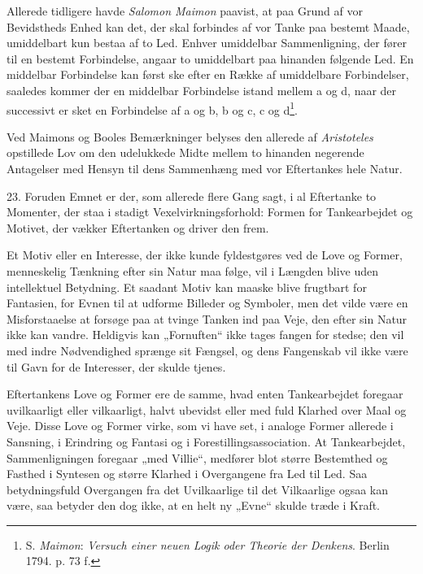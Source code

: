 \documentclass[12pt,a4paper]{book}
\newcommand{\apage}[1]{\marginnote{\footnotesize\textit{[#1]}}}
\begin{document}
Allerede tidligere havde \emph{Salomon Maimon} paavist, at paa Grund af
vor Bevidstheds Enhed kan det, der skal forbindes af vor Tanke paa
bestemt Maade, umiddelbart kun bestaa af to Led. Enhver umiddelbar
Sammenligning, der fører til en bestemt Forbindelse, angaar to
umiddelbart paa hinanden følgende Led. En middelbar Forbindelse kan
først ske efter en Række af umiddelbare Forbindelser, saaledes \apage{69} kommer
der en middelbar Forbindelse istand mellem a og d, naar der successivt
er sket en Forbindelse af a og b, b og c, c og d\footnote{S.
\emph{Maimon}: \emph{Versuch einer neuen Logik oder Theorie der Denkens}. Berlin 1794. p. 73 f.}.

Ved Maimons og Booles Bemærkninger belyses den allerede af
\emph{Aristoteles} opstillede Lov om den udelukkede Midte mellem to
hinanden negerende Antagelser med Hensyn til dens Sammenhæng med vor
Eftertankes hele Natur.

23. Foruden Emnet er der, som allerede flere Gang sagt, i al Eftertanke
to Momenter, der staa i stadigt Vexelvirkningsforhold: Formen for
Tankearbejdet og Motivet, der vækker Eftertanken og driver den frem.

Et Motiv eller en Interesse, der ikke kunde fyldestgøres ved de Love og
Former, menneskelig Tænkning efter sin Natur maa følge, vil i Længden
blive uden intellektuel Betydning. Et saadant Motiv kan maaske blive
frugtbart for Fantasien, for Evnen til at udforme Billeder og Symboler,
men det vilde være en Misforstaaelse at forsøge paa at tvinge Tanken ind
paa Veje, den efter sin Natur ikke kan vandre. Heldigvis kan
„Fornuften“ ikke tages fangen for stedse; den vil med indre Nødvendighed
sprænge sit Fængsel, og dens Fangenskab vil ikke være til Gavn for de
Interesser, der skulde tjenes.

Eftertankens Love og Former ere de samme, hvad enten Tankearbejdet
foregaar uvilkaarligt eller vilkaarligt, halvt ubevidst eller med fuld
Klarhed over Maal og Veje. Disse Love og Former virke, som vi have set,
i analoge Former allerede i Sansning, i Erindring og Fantasi og i
Forestillingsassociation. At Tankearbejdet, Sammenligningen foregaar
„med Villie“, medfører blot større Bestemthed og Fasthed i Syntesen og
større Klarhed i Overgangene fra Led til Led. Saa betydningsfuld
Overgangen fra det Uvilkaarlige til det Vilkaarlige ogsaa kan være, saa
betyder den dog ikke, at en helt ny „Evne“ skulde træde i Kraft.
\end{document}
